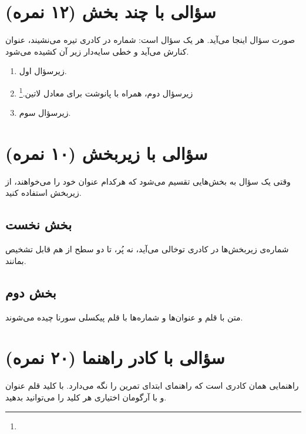 \section{سؤالی با چند بخش (۱۲ نمره)}

صورت سؤال اینجا می‌آید. هر  یک سؤال است: شماره در کادری
تیره می‌نشیند، عنوان کنارش می‌آید و خطی سایه‌دار زیر آن کشیده می‌شود.

\begin{enumerate}
    \item زیرسؤال اول.
    \item زیرسؤال دوم، همراه با پانوشت برای معادل
          لاتین.\footnote{}
    \item زیرسؤال سوم.
\end{enumerate}

\section{سؤالی با زیربخش (۱۰ نمره)}

وقتی یک سؤال به بخش‌هایی تقسیم می‌شود که هرکدام عنوان خود را می‌خواهند، از
زیربخش استفاده کنید.

\subsection{بخش نخست}

شماره‌ی زیربخش‌ها در کادری توخالی می‌آید، نه پُر، تا دو سطح از هم قابل تشخیص
بمانند.

\subsection{بخش دوم}

متن با قلم  و عنوان‌ها و شماره‌ها با قلم پیکسلی سورنا چیده
می‌شوند.

\section{سؤالی با کادر راهنما (۲۰ نمره)}

\begin{neobox}[neotitlefont=\pixelfont]{راهنمایی}
     همان کادری است که راهنمای ابتدای تمرین را نگه می‌دارد.
    با کلید  قلم عنوان و با آرگومان اختیاری هر کلید
     را می‌توانید بدهید.
\end{neobox}
